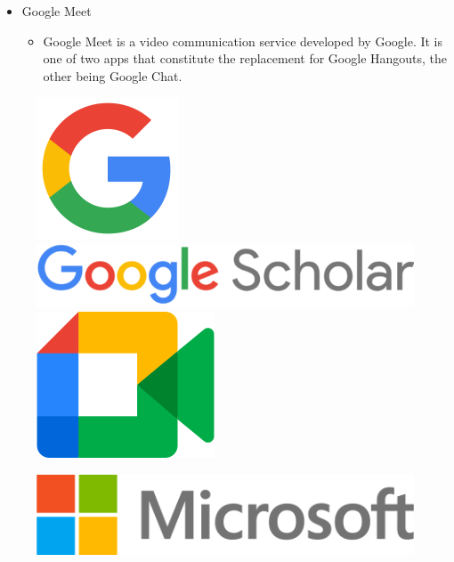 \documentclass[a4paper,11pt]{report}
\begin{document}
\begin{itemize}
    \item Google Meet
    \begin{itemize}
        \item Google Meet is a video communication service developed by Google. It is one of two apps that constitute the replacement for Google Hangouts, the other being Google Chat.
    \end{itemize}
\end{itemize}
\begin{figure}[!h]
\centering
      \includegraphics[scale=0.2]{img3.png}
      \hspace{1cm}
      \includegraphics[scale=0.3]{img4.png}
      \hspace{1cm}
      \includegraphics[scale=0.2]{img5.png}
\end{figure}



\clearpage

\begin{figure}
    \centering
    \includegraphics[scale=0.5]{img6.png}
    
\end{figure}
\end{document}
